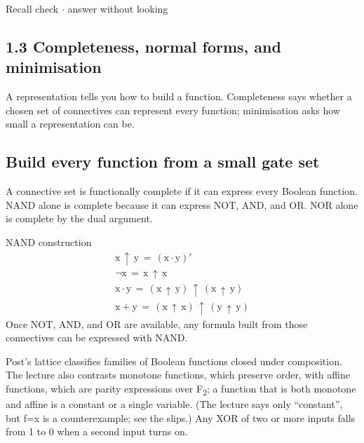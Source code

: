 \documentclass[11pt]{article}
\begin{document}
\begin{keepsection}
\begin{keepsection}
\begin{recallbox}{Recall check \ensuremath{\cdot} answer without looking}
\end{recallbox}
\end{keepsection}
\end{keepsection}

\begin{keepsection}
\section{1.3 Completeness, normal forms, and minimisation}

A representation tells you how to build a function. Completeness says whether a chosen set of connectives can represent every function; minimisation asks how small a representation can be.

\begin{keepsection}
\subsection{Build every function from a small gate set}

A connective set is functionally complete if it can express every Boolean function. NAND alone is complete because it can express NOT, AND, and OR. NOR alone is complete by the dual argument.

\begin{equationcard}{NAND construction}
\[ \begin{gathered} \mathrm{x}\, ↑\, \mathrm{y}\, =\, (\mathrm{x}\cdot \mathrm{y})' \\ \neg \mathrm{x}\, =\, \mathrm{x}\, ↑\, \mathrm{x} \\ \mathrm{x}\cdot \mathrm{y}\, =\, (\mathrm{x}\, ↑\, \mathrm{y})\, ↑\, (\mathrm{x}\, ↑\, \mathrm{y}) \\ \mathrm{x}+\mathrm{y}\, =\, (\mathrm{x}\, ↑\, \mathrm{x})\, ↑\, (\mathrm{y}\, ↑\, \mathrm{y}) \end{gathered} \]
{\small Once NOT, AND, and OR are available, any formula built from those connectives can be expressed with NAND.}
\end{equationcard}

Post’s lattice classifies families of Boolean functions closed under composition. The lecture also contrasts monotone functions, which preserve order, with affine functions, which are parity expressions over F\textsubscript{2}; a function that is both monotone and affine is a constant or a single variable. (The lecture says only “constant”, but f=x is a counterexample; see the slips.) Any XOR of two or more inputs falls from 1 to 0 when a second input turns on.
\end{keepsection}


\end{keepsection}
\end{document}

